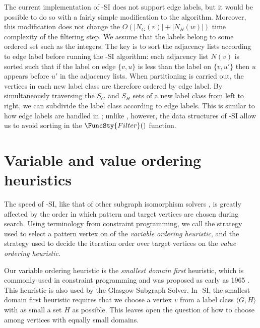 The current implementation of \McSplit-SI does not support edge labels, but it
would be possible to do so with a fairly simple modification to the algorithm.
Moreover, this modification does not change the
$O(|N_G(v)| + |N_H(w)|)$ time complexity of the filtering step.  We assume that
the labels belong to some ordered set such as the integers.  The key is to sort
the adjacency lists according to edge label before running the \McSplit-SI
algorithm: each adjacency list $N(v)$ is sorted such that if the label on edge
$\{v,u\}$ is less than the label on $\{v,u'\}$ then $u$ appears before $u'$ in
the adjacency lists.  When partitioning is carried out, the
vertices in each new label class are therefore ordered by edge label.
By simultaneously
traversing the $S_G$ and $S_H$ sets of a new label class from left to right, we
can subdivide the label class according to edge labels.  This is similar to how
edge labels are handled in \McSplit; unlike \McSplit, however, the
data structures of \McSplit-SI allow us to avoid sorting in the $\FuncSty{Filter}()$
function.

\section{Variable and value ordering heuristics}

The speed of \McSplit-SI, like that of other subgraph isomorphism solvers
\cite{DBLP:journals/tcbb/BonniciG17,DBLP:journals/jair/McCreeshPST18},
is greatly affected by the order
in which pattern and target vertices are chosen during search.
Using terminology from constraint programming, we call the strategy
used to select a pattern vertex on  of
 the \emph{variable ordering heuristic}, and the
strategy used to decide the iteration order over target vertices on
 the \emph{value ordering heuristic}.

Our variable ordering heuristic is the \emph{smallest domain first} heuristic,
which is commonly used in constraint programming and was proposed as early as
1965 \cite{golomb1965backtrack}.
This heuristic is also used by the Glasgow Subgraph Solver.
In \McSplit-SI, the smallest domain first heuristic requires
that we choose a vertex $v$ from a label class $\langle G, H \rangle$ with
as small a set $H$ as possible.  This leaves open the question of how
to choose among vertices with equally small domains.

